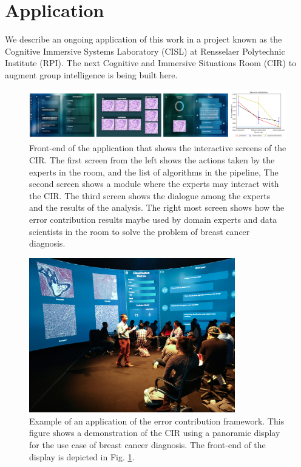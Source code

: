 \section{Application}
We describe an ongoing application of this work in a project known as the Cognitive Immersive Systems Laboratory \cite{su2017cognitive} (CISL) at Rensselaer Polytechnic Institute (RPI). The next Cognitive and Immersive Situations Room (CIR) to augment group intelligence is being built here.

\begin{figure}[ht!]
    \centering
    \includegraphics[width=\textwidth]{img/EP/CISL}
    \caption{Front-end of the application that shows the interactive screens of the CIR. The first screen from the left shows the actions taken by the experts in the room, and the list of algorithms in the pipeline, The second screen shows a module where the experts may interact with the CIR. The third screen shows the dialogue among the experts and the results of the analysis. The right most screen shows how the error contribution results maybe used by domain experts and data scientists in the room to solve the problem of breast cancer diagnosis.}
    \label{fig:CISL}
\end{figure}

\begin{figure}[ht!]
    \centering
    \includegraphics[width=0.8\textwidth]{img/EP/CIR.jpg}
    \caption{Example of an application of the error contribution framework. This figure shows a demonstration of the CIR using a panoramic display for the use case of breast cancer diagnosis. The front-end of the display is depicted in Fig. \ref{fig:CISL}.}
    \label{fig:CIR}
\end{figure}

